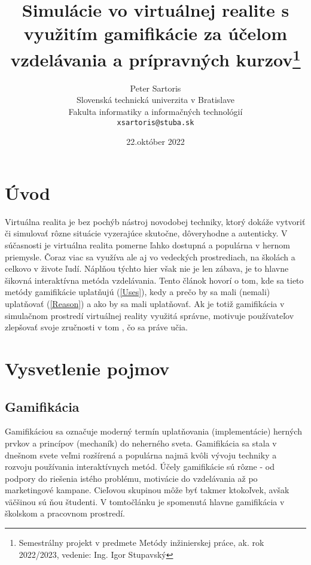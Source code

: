 \documentclass[10pt,slovak,a4paper]{article}
\title{Simulácie vo virtuálnej realite s využitím gamifikácie za účelom vzdelávania a prípravných kurzov\thanks{Semestrálny projekt v predmete Metódy inžinierskej práce, ak. rok 2022/2023, vedenie: Ing. Igor Stupavský}}
\author{Peter Sartoris\\[2pt]
	{\small Slovenská technická univerzita v Bratislave}\\
	{\small Fakulta informatiky a informačných technológií}\\
	{\small \texttt{xsartoris@stuba.sk}}
	}
\date{\small 22.október 2022}
\begin{document}
\maketitle


\section{Úvod} \label{Abstract}

Virtuálna realita je bez pochýb nástroj novodobej techniky, ktorý dokáže vytvoriť či simulovať rôzne situácie vyzerajúce skutočne, dôveryhodne a autenticky.
V súčasnosti je virtuálna realita pomerne ľahko dostupná a populárna v hernom priemysle. Čoraz viac sa využíva ale aj vo vedeckých prostrediach, na školách a celkovo v živote ľudí. 
Náplňou týchto hier však nie je len zábava, je to hlavne šikovná interaktívna metóda vzdelávania.
Tento článok hovorí o tom, kde sa tieto metódy gamifikácie uplatňujú (\ref{Uses}), kedy a prečo by sa mali (nemali) uplatňovať (\ref{Reason}) a ako by sa mali uplatňovať. 
Ak je totiž gamifikácia v simulačnom prostredí  virtuálnej reality využitá správne, motivuje používateľov zlepšovať svoje zručnosti v tom , čo sa práve učia.


\section{Vysvetlenie pojmov} \label{Terms}

\subsection{Gamifikácia} \label{Gamification:gamification}

Gamifikáciou sa označuje moderný termín uplatňovania (implementácie) herných prvkov a princípov (mechaník) do neherného sveta. \cite{marczewski2013gamification} Gamifikácia sa stala v dnešnom svete veľmi rozšírená a populárna najmä kvôli vývoju techniky a rozvoju používania interaktívnych metód. Účely gamifikácie sú rôzne - od podpory do riešenia istého problému, motivácie do vzdelávania až po marketingové kampane. Cieľovou skupinou môže byť takmer ktokoľvek, avšak väčšinou sú ňou študenti. V tomtočlánku je spomenutá hlavne gamifikácia v školskom a pracovnom prostredí. \newline \newline
\end{document}
